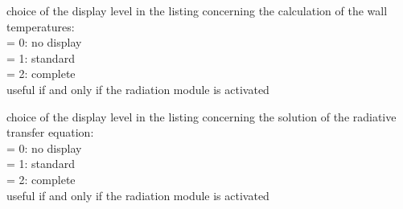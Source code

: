 {choice of the display level in the listing concerning the calculation of
the wall temperatures:\\
\hspace*{1.3cm}= 0: no display\\
\hspace*{1.3cm}= 1: standard\\
\hspace*{1.3cm}= 2: complete\\
useful if and only if the radiation module is activated}

{choice of the display level in the listing concerning the solution of
the radiative transfer equation:\\
\hspace*{1.3cm}= 0: no display\\
\hspace*{1.3cm}= 1: standard\\
\hspace*{1.3cm}= 2: complete\\
useful if and only if the radiation module is activated}

